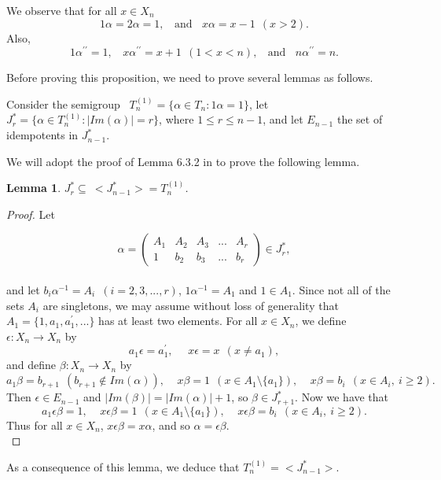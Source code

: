\documentclass[10pt]{extarticle}
\numberwithin{equation}{section}
\numberwithin{bbb}{section}
\newtheorem{lemma}{Lemma}[section]
\numberwithin{equation}{section}
\begin{document}
We observe that for all $x \in X_n$
$$1\alpha=2\alpha=1, \ \ \ \ \text{and} \ \ \ \  x\alpha=x-1 \ \ (x > 2).$$
Also, 
$$1\alpha^{\prime\prime}=1, \ \ \ \ x \alpha^{\prime\prime}=x+1 \ \ (1 < x < n), \ \ \ \  \text{and} \ \ \ \ n\alpha^{\prime\prime}=n.$$

\vspace{0.2cm}
Before proving this proposition, we need to prove several lemmas as follows.

\vspace{0.5cm}
Consider the semigroup \ $T_n^{(1)}=\{\alpha \in T_n : 1\alpha=1\}$, let \ $J^*_{r}=\{\alpha \in T_n^{(1)} : |Im(\alpha)|=r\}$, where $1 \leq r \leq n-1$, and let $E_{n-1}$ the set of idempotents in $J^*_{n-1}$.

\vspace{0.5cm}
We will adopt the proof of Lemma 6.3.2 in \cite{6} to prove the following lemma.

\begin{lemma}
 $J^*_{r}\subseteq \ <J^*_{n-1}>=T_n^{(1)}$. 
\end{lemma}

\begin{proof}
Let 

$$\alpha=
\begin{pmatrix}  A_1&A_2&A_3&...&A_r\\1&b_2&b_3&...&b_r
\end{pmatrix}
\in J^*_r,$$\\[5pt]
and let $b_i\alpha^{-1}=A_i \,\,\, (i=2,3,...,r)$, $ 1\alpha^{-1}=A_1$ and $1\in A_1$. Since not all of the sets $A_i$ are singletons, we may assume without loss of generality that $A_1=\{1,a_1,a_1^\prime,...\}$ has at least two elements. For all $x \in X_n$, we define $\epsilon: X_n \rightarrow X_n$ by
$$a_1\epsilon=a_1^\prime, \ \ \ \  \ \  x\epsilon=x \ \ (x \neq a_1),$$
and define $\beta: X_n \rightarrow X_n$ by
$$a_1\beta=b_{r+1} \ \ (b_{r+1} \notin Im(\alpha)), \ \ \ \ \ x\beta=1 \ \ (x \in A_1\setminus \{a_1\}), \ \ \ \ \ x\beta=b_i \ \ (x \in A_i, \ i\geq 2).$$
Then $\epsilon \in E_{n-1}$ and $|Im(\beta)|=|Im(\alpha)|+1$, so $\beta \in J^*_{r+1}$. Now we have that  
 $$a_1\epsilon\beta=1, \ \ \ \ \ x\epsilon\beta=1 \ \ (x \in A_1\setminus \{a_1\}), \ \ \ \ \ x\epsilon\beta=b_i \ \ (x \in A_i, \ i\geq 2).$$
Thus for all $x\in X_n$, $x\epsilon\beta=x\alpha$, and so $\alpha=\epsilon\beta$.\\
\end{proof}
As a consequence of this lemma, we deduce that $T_n^{(1)}=<J^*_{n-1}>$.
\end{document}
